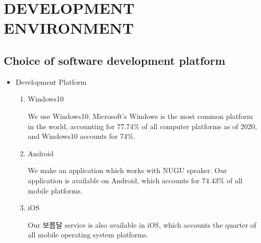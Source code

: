 \documentclass[conference]{IEEEtran}
\begin{document}
\section{DEVELOPMENT ENVIRONMENT}
\subsection{Choice of software development platform}
\begin{itemize}
\setlength{\parindent}{2ex}
    \item Development Platform
    \begin{enumerate}
    \setlength{\parindent}{2ex}
        \item Windows10  
        
        We use Windows10. Microsoft's Windows is the most common platform in the world, accounting for 77.74\% of all computer platforms as of 2020, and Windows10 accounts for 74\%.\cite{b3}
        \item Android 
        
        We make an application which works with NUGU speaker. Our application is available on Android, which accounts for 74.43\% of all mobile platforms.\cite{b4}
        
        \item iOS  
        
        Our 보름달 service is also available in iOS, which accounts the quarter of all mobile operating system platforms.\cite{b5}
    \end{enumerate}
\end{itemize}
\vspace{0.5mm}
\end{document}
